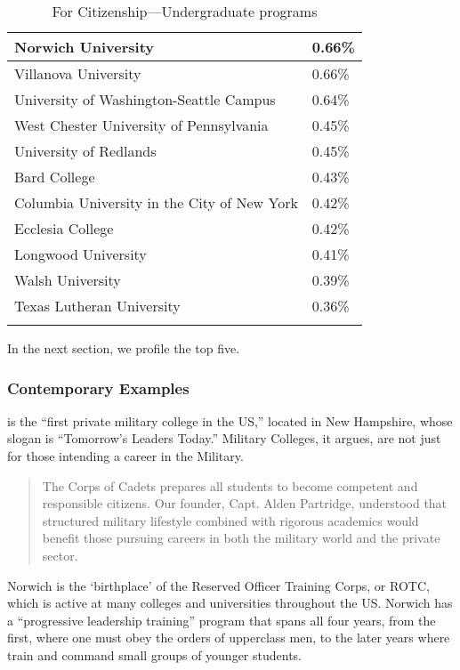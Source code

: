  \begin{longtable}[!t]{ | p{10cm} | R{2.5cm} |   }
\hline 
 Norwich University&0.66\%\\ \hline
Villanova University&0.66\%\\ \hline
University of Washington-Seattle Campus&0.64\%\\ \hline
West Chester University of Pennsylvania&0.45\%\\ \hline
University of Redlands&0.45\%\\ \hline
Bard College&0.43\%\\ \hline
Columbia University in the City of New York&0.42\%\\ \hline
Ecclesia College&0.42\%\\ \hline
Longwood University&0.41\%\\ \hline
Walsh University&0.39\%\\ \hline
Texas Lutheran University&0.36\%\\ \hline
            \caption{For Citizenship---Undergraduate programs}
\label{table: forCitizenUndergraduate}
\end{longtable}

\begin{quote}
\end{quote}

In the next section, we profile the top five.

\subsubsection{Contemporary Examples}
\label{contemporaryexamples}

 is the ``first private military college in the US,'' located in New Hampshire, whose slogan is ``Tomorrow's Leaders Today.'' Military Colleges, it argues, are not just for those intending a career in the Military. 

\begin{quote}

The Corps of Cadets prepares all students to become competent and responsible citizens. Our founder, Capt. Alden Partridge, understood that structured military lifestyle combined with rigorous academics would benefit those pursuing careers in both the military world and the private sector. 
\end{quote}

Norwich is the `birthplace' of the Reserved Officer Training Corps, or ROTC, which is active at many colleges and universities throughout the US. Norwich has a ``progressive leadership training'' program that spans all four years, from the first, where one must obey the orders of upperclass men, to the later years where train and command small groups of younger students. 


